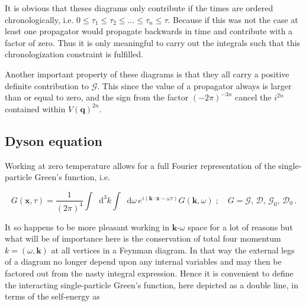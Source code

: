 \documentclass[12pt]{report}
\renewcommand{\vec}[1]{\boldsymbol{\mathbf{#1}}}                        %
\newcommand*\diff{\mathop{}\!\mathrm{d}}
\newcommand{\Gt}{\mathcal{G}}
\newcommand{\Dt}{\mathcal{D}}
\begin{document}
It is obvious that theses diagrams only contribute if the times are ordered chronologically, i.e. $ 0 \le \tau_1 \le \tau_2 \le \dots \le \tau_n \le \tau $. Because if this was not the case at least one propagator would propagate backwards in time and contribute with a factor of zero. Thus it is only meaningful to carry out the integrals such that this chronologization constraint is fulfilled.

Another important property of these diagrams is that they all carry a positive definite contribution to $ \Gt $. This since the value of a propagator always is larger than or equal to zero, and the sign from the factor $ (-2\pi)^{-3n} $ cancel the $ i^{2n} $ contained within $ V(\vec q)^{2n} $.

\subsection{Dyson equation}

Working at zero temperature allows for a full Fourier representation of the single-particle Green's function, i.e.

\begin{equation}
	G(\vec x, \tau) = \frac{1}{(2\pi)^4} \int \diff^3 k \int \diff \omega \, e^{i (\vec k \cdot \vec x - \omega \tau)} G(\vec k, \omega)
	\; ; \quad G = \Gt, \, \Dt, \, \Gt_0, \, \Dt_0 \,.
\end{equation}

It so happens to be more pleasant working in $ \vec k $-$ \omega $ space for a lot of reasons but what will be of importance here is the conservation of total four momentum $ k = (\omega, \vec k) $ at all vertices in a Feynman diagram. In that way the external legs of a diagram no longer depend upon any internal variables and may then be factored out from the nasty integral expression. Hence it is convenient to define the interacting single-particle Green's function, here depicted as a double line, in terms of the self-energy as
\end{document}
